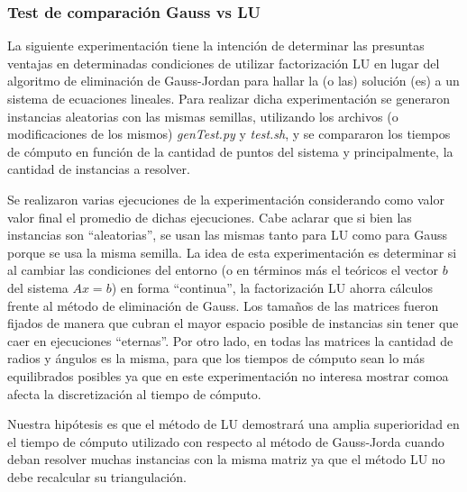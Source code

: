 \subsubsection{Test de comparación Gauss vs LU}
La siguiente experimentación tiene la intención de determinar las presuntas ventajas en determinadas condiciones de 
utilizar factorización LU en lugar del algoritmo de eliminación de Gauss-Jordan para hallar la (o las) solución (es) 
a un sistema de ecuaciones lineales. Para realizar dicha experimentación se generaron instancias aleatorias con las 
mismas semillas, utilizando los archivos (o modificaciones de los mismos) \emph{genTest.py} y \emph{test.sh}, y se 
compararon los tiempos de cómputo en función de la cantidad de puntos del sistema y principalmente, la cantidad de 
instancias a resolver. 

Se realizaron varias ejecuciones de la experimentación considerando como valor valor final el promedio de dichas 
ejecuciones. Cabe aclarar que si bien las instancias son ``aleatorias'', se usan las mismas tanto para LU como para 
Gauss porque se usa la misma semilla. La idea de esta experimentación es determinar si al cambiar las condiciones del 
entorno (o en términos más el teóricos el vector $b$ del sistema $Ax=b$) en forma ``continua'', la factorización LU 
ahorra cálculos frente al método de eliminación de Gauss. Los tamaños de las matrices fueron fijados de manera que 
cubran el mayor espacio posible de instancias sin tener que caer en ejecuciones ``eternas''. Por otro lado, en todas 
las matrices la cantidad de radios y ángulos es la misma, para que los tiempos de cómputo sean lo más equilibrados
posibles ya que en este experimentación no interesa mostrar comoa afecta la discretización al tiempo de cómputo.

Nuestra hipótesis es que el método de LU demostrará una amplia superioridad en el tiempo de cómputo utilizado
con respecto al método de Gauss-Jorda cuando deban resolver muchas instancias con la misma matriz ya que el método
LU no debe recalcular su triangulación.
